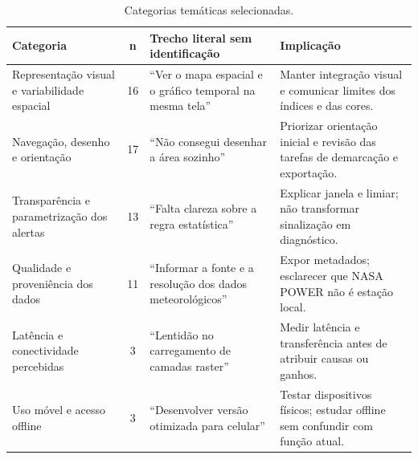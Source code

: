 \begin{table}[htbp]
\centering\small
\caption{Categorias temáticas selecionadas.}
\label{tab:usuarios-temas}
\begin{tabular}{p{}cp{}p{}}
\hline
Categoria & n & Trecho literal sem identificação & Implicação\\ \hline
Representação visual e variabilidade espacial & 16 & ``Ver o mapa espacial e o gráfico temporal na mesma tela'' & Manter integração visual e comunicar limites dos índices e das cores.\\
Navegação, desenho e orientação & 17 & ``Não consegui desenhar a área sozinho'' & Priorizar orientação inicial e revisão das tarefas de demarcação e exportação.\\
Transparência e parametrização dos alertas & 13 & ``Falta clareza sobre a regra estatística'' & Explicar janela e limiar; não transformar sinalização em diagnóstico.\\
Qualidade e proveniência dos dados & 11 & ``Informar a fonte e a resolução dos dados meteorológicos'' & Expor metadados; esclarecer que NASA POWER não é estação local.\\
Latência e conectividade percebidas & 3 & ``Lentidão no carregamento de camadas raster'' & Medir latência e transferência antes de atribuir causas ou ganhos.\\
Uso móvel e acesso offline & 3 & ``Desenvolver versão otimizada para celular'' & Testar dispositivos físicos; estudar offline sem confundir com função atual.\\
\hline
\end{tabular}
\end{table}

